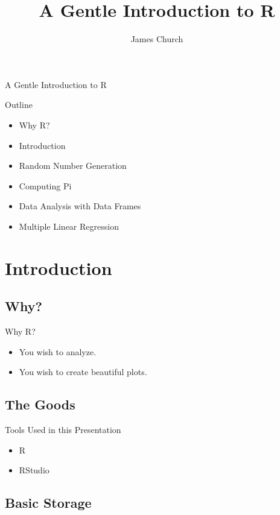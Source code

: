 \documentclass{beamer}
\author{James Church}
\title{A Gentle Introduction to R}
\begin{document}
\frame[plain]{ \titlepage }

\begin{frame}{A Gentle Introduction to R}

    Outline

    \begin{itemize}
        \item Why R?
        \item Introduction
        \item Random Number Generation
        \item Computing Pi
        \item Data Analysis with Data Frames
        \item Multiple Linear Regression
    \end{itemize}

\end{frame}

\section{Introduction}

\subsection{Why?}

\begin{frame}{Why R?}
     \begin{itemize}
        \item You wish to analyze.
        \item You wish to create beautiful plots.
    \end{itemize}
\end{frame}

\subsection{The Goods}

\begin{frame}{Tools Used in this Presentation}
    \begin{itemize}
        \item R
        \item RStudio
    \end{itemize}
\end{frame}

\subsection{Basic Storage}
\end{document}
